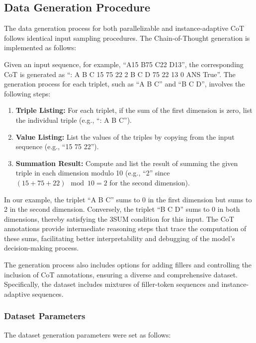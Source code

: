 \documentclass{article}
\begin{document}
\subsection{Data Generation Procedure}

The data generation process for both parallelizable and instance-adaptive CoT follows identical input sampling procedures. The Chain-of-Thought generation is implemented as follows:

Given an input sequence, for example, ``A15 B75 C22 D13'', the corresponding CoT is generated as ``: A B C 15 75 22 2 B C D 75 22 13 0 ANS True''. The generation process for each triplet, such as ``A B C'' and ``B C D'', involves the following steps:

\begin{enumerate}
    \item \textbf{Triple Listing:} For each triplet, if the sum of the first dimension is zero, list the individual triple (e.g., ``: A B C'').
    \item \textbf{Value Listing:} List the values of the triples by copying from the input sequence (e.g., ``15 75 22'').
    \item \textbf{Summation Result:} Compute and list the result of summing the given triple in each dimension modulo 10 (e.g., ``2'' since \( (15 + 75 + 22) \mod 10 = 2 \) for the second dimension).
\end{enumerate}

In our example, the triplet ``A B C'' sums to 0 in the first dimension but sums to 2 in the second dimension. Conversely, the triplet ``B C D'' sums to 0 in both dimensions, thereby satisfying the 3SUM condition for this input. The CoT annotations provide intermediate reasoning steps that trace the computation of these sums, facilitating better interpretability and debugging of the model's decision-making process.

The generation process also includes options for adding fillers and controlling the inclusion of CoT annotations, ensuring a diverse and comprehensive dataset. Specifically, the dataset includes mixtures of filler-token sequences and instance-adaptive sequences.

\subsubsection{Dataset Parameters}

The dataset generation parameters were set as follows:
\end{document}
